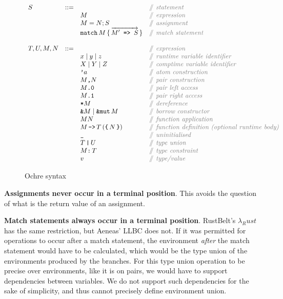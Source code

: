 \documentclass[12pt,twoside]{report}
\begin{document}
\begin{figure}[H]
  \arraycolsep=1pt %
  \centering

  \vspace{-2ex} %
  \[
  \begin{array}[t]{llll}
    S & ::= & & \comment{statement} \\
    & & M & \comment{expression} \\
    & & M = N; S & \comment{assignment} \\
    & & \mono{match}\,M\,\{\,\overrightarrow{M'\mono{ => }S}\,\} & \comment{match statement} \\
    \\
    T, U, M, N & ::= & & \comment{expression} \\
    && x \mid{} y \mid{} z  & \comment{runtime variable identifier} \\
    && X \mid{} Y \mid{} Z  & \comment{comptime variable identifier} \\
    && \mono{'}a & \comment{atom construction} \\
    && M\mono{,} N & \comment{pair construction} \\
    && M\mono{.0} & \comment{pair left access} \\
    && M\mono{.1} & \comment{pair right access} \\
    && \mono{*}M & \comment{dereference} \\
    && \mono{\&}M \mid \mono{\&mut}\,M & \comment{borrow constructor} \\
    && M N & \comment{function application} \\
    && M \, \mono{->} \, T \,(\mono{\{}\,N\,\mono{\}}) & \comment{function definition (optional runtime body)} \\
    && \mono{\_} & \comment{uninitialised} \\
    && T\,\mono{|}\,U & \comment{type union} \\
    && M\mono{:}\,T & \comment{type constraint} \\
    && v & \comment{type/value} \\
  \end{array} %
  \]
\caption{Ochre syntax} %
\label{fig:syntax} %
\end{figure} %

\textbf{Assignments never occur in a terminal position}. This avoids the question of what is the return value of an assignment.

\textbf{Match statements always occur in a terminal position}. RustBelt's $\lambda_Rust$ \cite{jungRustBeltSecuringFoundations2018a} has the same restriction, but Aeneas' LLBC \cite{aeneas} does not. If it was permitted for operations to occur after a match statement, the environment \textit{after} the match statement would have to be calculated, which would be the type union of the environments produced by the branches. For this type union operation to be precise over environments, like it is on pairs, we would have to support dependencies between variables. We do not support such dependencies for the sake of simplicity, and thus cannot precisely define environment union.
\end{document}
